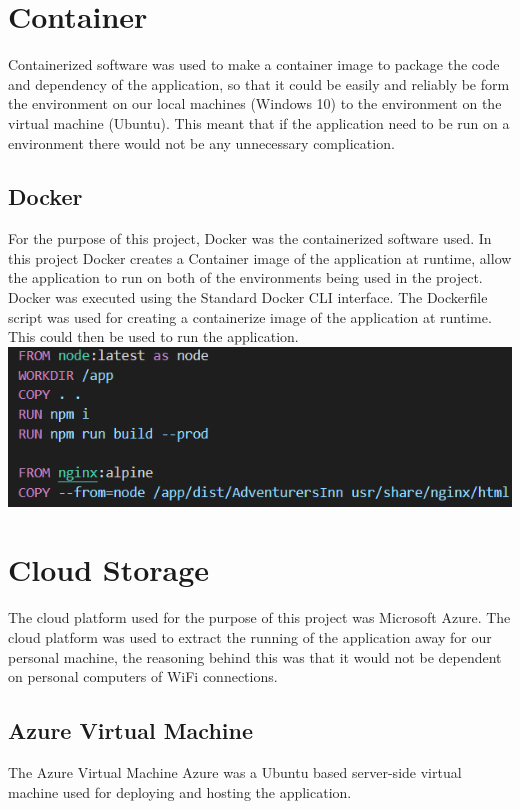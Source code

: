 \section{Container}
Containerized software was used to make a container image to package the code and dependency of the application, so that it could be easily and reliably be form the environment on our local machines (Windows 10) to the environment on the virtual machine (Ubuntu).  This meant that if the application need to be run on a environment there would not be any unnecessary complication.

\subsection{Docker}
For the purpose of this project, Docker was the containerized software used.  In this project Docker creates a Container image of the application at runtime, allow the application to run on both of the environments being used in the project.  Docker was executed using the Standard Docker CLI interface. The Dockerfile script was used for creating a containerize image of the application at runtime.  This could then be used to run the application.
\includegraphics[scale=0.3]{./img/docker.PNG}

\section{Cloud Storage}
The cloud platform used for the purpose of this project was Microsoft Azure.  The cloud platform was used to extract the running of the application away for our personal machine, the reasoning behind this was that it would not be dependent on personal computers of WiFi connections.  

\subsection{Azure Virtual Machine}
The Azure Virtual Machine Azure was a Ubuntu based server-side virtual machine used for deploying and hosting the application.